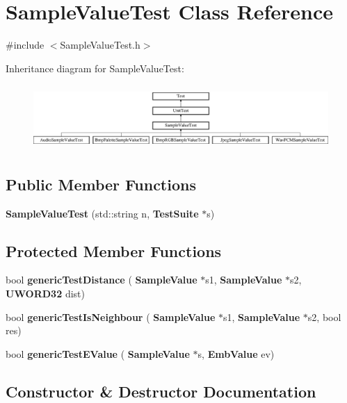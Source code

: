 \section{Sample\+Value\+Test Class Reference}
\label{classSampleValueTest}


{\ttfamily \#include $<$Sample\+Value\+Test.\+h$>$}

Inheritance diagram for Sample\+Value\+Test\+:\begin{figure}[H]
\begin{center}
\leavevmode
\includegraphics[height=2.502793cm]{classSampleValueTest}
\end{center}
\end{figure}
\subsection*{Public Member Functions}
\begin{DoxyCompactItemize}
\item 
\textbf{ Sample\+Value\+Test} (std\+::string n, \textbf{ Test\+Suite} $\ast$s)
\end{DoxyCompactItemize}
\subsection*{Protected Member Functions}
\begin{DoxyCompactItemize}
\item 
bool \textbf{ generic\+Test\+Distance} (\textbf{ Sample\+Value} $\ast$s1, \textbf{ Sample\+Value} $\ast$s2, \textbf{ U\+W\+O\+R\+D32} dist)
\item 
bool \textbf{ generic\+Test\+Is\+Neighbour} (\textbf{ Sample\+Value} $\ast$s1, \textbf{ Sample\+Value} $\ast$s2, bool res)
\item 
bool \textbf{ generic\+Test\+E\+Value} (\textbf{ Sample\+Value} $\ast$s, \textbf{ Emb\+Value} ev)
\end{DoxyCompactItemize}


\subsection{Constructor \& Destructor Documentation}
\mbox{\label{classSampleValueTest_a65687e9172466f10ec1f3f97b367b76a}} 
